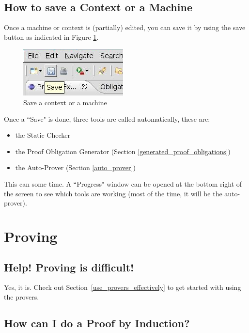 \subsection{How to save a Context or a Machine}

Once a machine or context is (partially) edited, you can save it by using the save button as indicated in Figure \ref{fig_faq_saveaction}.

\begin{figure}[!ht]
\begin{center}
	\includegraphics{img/faq/faq_saveaction.png}
	\caption{Save a context or a machine}
	\label{fig_faq_saveaction}
\end{center}
\end{figure}

Once a ``Save" is done, three tools are called automatically, these are:

\begin{itemize}
	\item the Static Checker
	\item the Proof Obligation Generator (Section \ref{generated_proof_obligations})
	\item the Auto-Prover (Section \ref{auto_prover})
\end{itemize}

This can some time. A ``Progress" window can be opened at the bottom right of the screen to see which tools are working (most of the time, it will be the auto-prover). 

\section{Proving}

\subsection{Help!  Proving is difficult!}

Yes, it is.  Check out Section~\ref{use_provers_effectively} to get started with using the provers.

\subsection{How can I do a Proof by Induction?}

